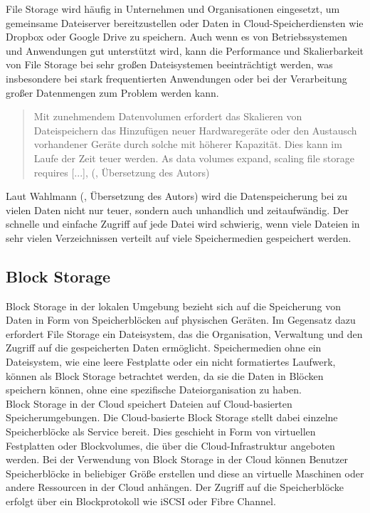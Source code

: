 File Storage wird häufig in Unternehmen und Organisationen eingesetzt, um gemeinsame Dateiserver bereitzustellen oder Daten in Cloud-Speicherdiensten wie Dropbox oder Google Drive zu speichern.
Auch wenn es von Betriebssystemen und Anwendungen gut unterstützt wird, kann die Performance und Skalierbarkeit von File Storage bei sehr großen Dateisystemen beeinträchtigt werden, was insbesondere bei stark frequentierten Anwendungen oder bei der Verarbeitung großer Datenmengen zum Problem werden kann. 

\newpage

\begin{quote}
	Mit zunehmendem Datenvolumen erfordert das Skalieren von Dateispeichern das Hinzufügen neuer Hardwaregeräte oder den Austausch vorhandener Geräte durch solche mit höherer Kapazität. Dies kann im Laufe der Zeit teuer werden. \glqq As data volumes expand, scaling file storage requires [...]\grqq, (\cite{nx-fileScala}, Übersetzung des Autors)
\end{quote}

Laut Wahlmann (\citeyear{nx-fileScala}, Übersetzung des Autors) wird die Datenspeicherung bei zu vielen Daten nicht nur teuer, sondern auch unhandlich und zeitaufwändig. Der schnelle und einfache Zugriff auf jede Datei wird schwierig, wenn viele Dateien in sehr vielen Verzeichnissen verteilt auf viele Speichermedien gespeichert werden. 

\newpage

\subsection{Block Storage}

Block Storage in der lokalen Umgebung bezieht sich auf die Speicherung von Daten in Form von Speicherblöcken auf physischen Geräten. Im Gegensatz dazu erfordert File Storage ein Dateisystem, das die Organisation, Verwaltung und den Zugriff auf die gespeicherten Daten ermöglicht. Speichermedien ohne ein Dateisystem, wie eine leere Festplatte oder ein nicht formatiertes Laufwerk, können als Block Storage betrachtet werden, da sie die Daten in Blöcken speichern können, ohne eine spezifische Dateiorganisation zu haben.\\

Block Storage in der Cloud speichert Dateien auf Cloud-basierten Speicherumgebungen. Die Cloud-basierte Block Storage stellt dabei einzelne Speicherblöcke als Service bereit. Dies geschieht in Form von virtuellen Festplatten oder Blockvolumes, die über die Cloud-Infrastruktur angeboten werden. Bei der Verwendung von Block Storage in der Cloud können Benutzer Speicherblöcke in beliebiger Größe erstellen und diese an virtuelle Maschinen oder andere Ressourcen in der Cloud anhängen. Der Zugriff auf die Speicherblöcke erfolgt über ein Blockprotokoll wie iSCSI oder Fibre Channel.\\

